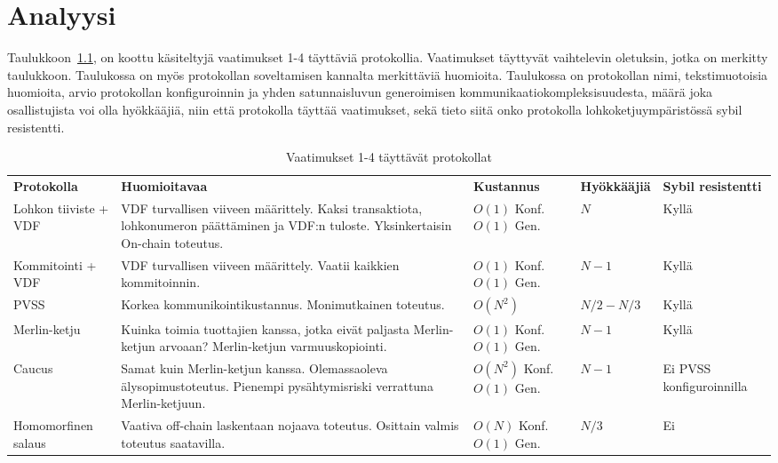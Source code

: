 \chapter{Analyysi\label{discussion}}



Taulukkoon~\ref{table:results}, on koottu käsiteltyjä vaatimukset 1-4 täyttäviä protokollia. Vaatimukset täyttyvät vaihtelevin oletuksin, jotka on merkitty taulukkoon. Taulukossa on myös protokollan soveltamisen kannalta merkittäviä huomioita. Taulukossa on protokollan nimi, tekstimuotoisia huomioita, arvio protokollan konfiguroinnin ja yhden satunnaisluvun generoimisen kommunikaatiokompleksisuudesta, määrä joka osallistujista voi olla hyökkääjiä, niin että protokolla täyttää vaatimukset, sekä tieto siitä onko protokolla lohkoketjuympäristössä sybil resistentti.

\begin{table}[h]
    \caption{Vaatimukset 1-4 täyttävät protokollat}
    \label{table:results}
    \begin{tabular}{  l  p{4cm}  p{2.5cm} p{2cm} p{4cm}}
        \toprule

\textbf{Protokolla}      
& \textbf{Huomioitavaa}
& \textbf{Kustannus}
& \textbf{Hyökkääjiä} 
& \textbf{Sybil resistentti} \\
Lohkon tiiviste + VDF 
& VDF turvallisen viiveen määrittely. Kaksi transaktiota, lohkonumeron päättäminen ja VDF:n tuloste. Yksinkertaisin On-chain toteutus.
& $O(1)$ Konf. $O(1)$ Gen.
& $N$
& Kyllä  \\\hline
Kommitointi + VDF       
& VDF turvallisen viiveen määrittely. Vaatii kaikkien kommitoinnin.                   
&  $O(1)$ Konf. $O(1)$ Gen.
& $N-1$  
& Kyllä  \\\hline
PVSS        
& Korkea kommunikointikustannus. Monimutkainen toteutus.
& $O(N^2)$
& $N/2 - N/3$  
& Kyllä \\\hline
Merlin-ketju
& Kuinka toimia tuottajien kanssa, jotka eivät paljasta Merlin-ketjun arvoaan? Merlin-ketjun varmuuskopiointi.
& $O(1)$ Konf. $O(1)$ Gen. 
& $N-1$ 
& Kyllä  \\\hline
Caucus
& Samat kuin Merlin-ketjun kanssa. Olemassaoleva älysopimustoteutus. Pienempi pysähtymisriski verrattuna Merlin-ketjuun.
& $O(N^2)$ Konf. $O(1)$ Gen. 
& $N-1$ 
& Ei PVSS konfiguroinnilla \\\hline
Homomorfinen salaus
& Vaativa off-chain laskentaan nojaava toteutus. Osittain valmis toteutus saatavilla.
& $O(N)$ Konf. $O(1)$ Gen. 
& $N/3$
& Ei  \\\hline
        \bottomrule

    \end{tabular}
\end{table}

